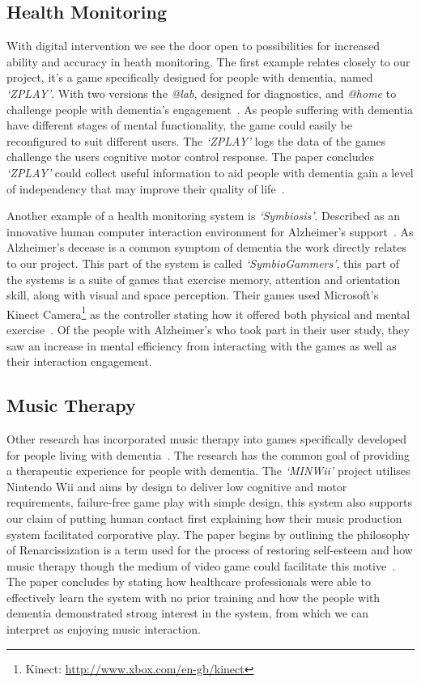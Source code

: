 \subsection{Health Monitoring}
With digital intervention we see the door open to possibilities for increased ability and accuracy in heath monitoring. The first example relates closely to our project, it's a game specifically designed for people with dementia, named \emph{`ZPLAY'}. With two versions the \emph{@lab}, designed for diagnostics, and \emph{@home} to challenge people with dementia's engagement~\cite{makedon2010interactive}. 
As people suffering with dementia have different stages of mental functionality, the game could easily be reconfigured to suit different users. 
The \emph{`ZPLAY'} logs the data of the games challenge the users cognitive motor control response. 
The paper concludes \emph{`ZPLAY'} could collect useful information to aid people with dementia gain a level of independency that may improve their quality of life~\cite{makedon2010interactive}.

Another example of a health monitoring system is \emph{`Symbiosis'}. Described as an innovative human computer interaction environment for Alzheimer's support~\cite{symbiosis}. As Alzheimer's decease is a common symptom of dementia the work directly relates to our project. 
This part of the system is called \emph{`SymbioGammers'}, this part of the systems is a suite of games that exercise memory, attention and orientation skill, along with visual and space perception. 
Their games used Microsoft's Kinect Camera\footnote{Kinect: \url{http://www.xbox.com/en-gb/kinect}} as the controller stating how it offered both physical and mental exercise~\cite{symbiosis}.
Of the people with Alzheimer's who took part in their user study, they saw an increase in mental efficiency from interacting with the games as well as their interaction engagement.

\subsection{Music Therapy}
Other research has incorporated music therapy into games specifically developed for people living with dementia~\cite{Boulay2011, symbiosis, Riley2009}. The research has the common goal of providing a therapeutic experience for people with dementia. The \emph{`MINWii'} project utilises Nintendo Wii and aims by design to deliver low cognitive and motor requirements, failure-free game play with simple design, this system also supports our claim of putting human contact first explaining how their music production system facilitated corporative play. The paper begins by outlining the philosophy of Renarcissization is a term used for the process of restoring self-esteem and how music therapy though the medium of video game could facilitate this motive~\cite{Boulay2011}. The paper concludes by stating how healthcare professionals were able to effectively learn the system with no prior training and how the people with dementia demonstrated strong interest in the system, from which we can interpret as enjoying music interaction.

